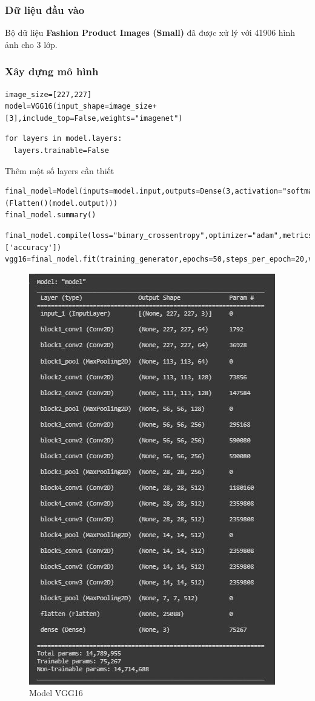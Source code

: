 \subsubsection{Dữ liệu đầu vào}
Bộ dữ liệu \textbf{Fashion Product Images (Small)} đã được xử lý với 41906 hình ảnh cho 3 lớp.
\subsubsection{Xây dựng mô hình}
\begin{lstlisting}
image_size=[227,227]
model=VGG16(input_shape=image_size+[3],include_top=False,weights="imagenet")
\end{lstlisting}
\begin{lstlisting}
for layers in model.layers:
  layers.trainable=False
\end{lstlisting}
Thêm một số layers cần thiết
\begin{lstlisting}
final_model=Model(inputs=model.input,outputs=Dense(3,activation="softmax")(Flatten()(model.output)))
final_model.summary()
\end{lstlisting}
\begin{lstlisting}
final_model.compile(loss="binary_crossentropy",optimizer="adam",metrics=['accuracy'])  
vgg16=final_model.fit(training_generator,epochs=50,steps_per_epoch=20,validation_data=validation_generator)
\end{lstlisting}
\newpage
\begin{center}
    \begin{figure}[!h]
        \centering
        \includegraphics[scale = 1]{fileanh/20.jpg}
        \caption{Model VGG16}
    \end{figure}
\end{center}
